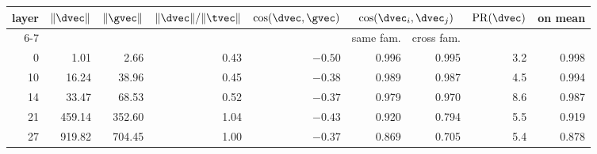 \begin{tabular}{rrrrrrrrr}
\toprule
\rowcolor{TableHeader}
layer & $\|\dvec\|$ & $\|\gvec\|$ & $\|\dvec\|/\|\tvec\|$ & $\cos(\dvec,\gvec)$
& \multicolumn{2}{c}{$\cos(\dvec_i,\dvec_j)$} & $\mathrm{PR}(\dvec)$ & on mean \\
\cmidrule(lr){6-7}
& & & & & same fam. & cross fam. & & \\
\midrule
 0 &     1.01 &     2.66 & 0.43 & $-0.50$ & 0.996 & 0.995 & 3.2 & 0.998 \\
10 &    16.24 &    38.96 & 0.45 & $-0.38$ & 0.989 & 0.987 & 4.5 & 0.994 \\
14 &    33.47 &    68.53 & 0.52 & $-0.37$ & 0.979 & 0.970 & 8.6 & 0.987 \\
21 &   459.14 &   352.60 & 1.04 & $-0.43$ & 0.920 & 0.794 & 5.5 & 0.919 \\
27 &   919.82 &   704.45 & 1.00 & $-0.37$ & 0.869 & 0.705 & 5.4 & 0.878 \\
\bottomrule
\end{tabular}
